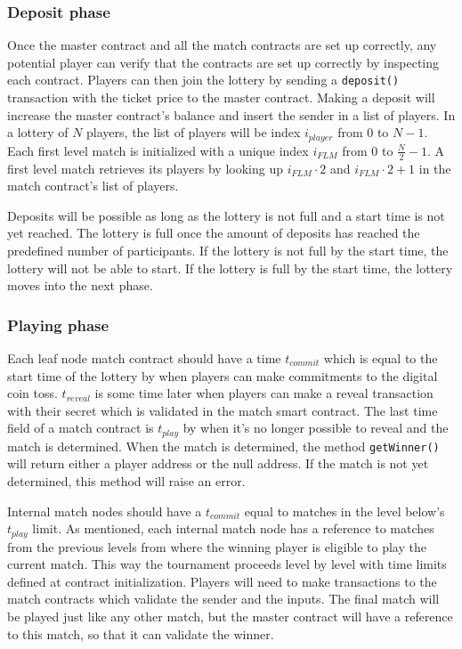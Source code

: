 \subsubsection{Deposit phase}
Once the master contract and all the match contracts are set up correctly, any potential player can verify that the contracts are set up correctly by inspecting each contract. Players can then join the lottery by sending a \texttt{deposit()} transaction with the ticket price to the master contract. Making a deposit will increase the master contract's balance and insert the sender in a list of players. In a lottery of $N$ players, the list of players will be index $i_{player}$ from $0$ to $N-1$. Each first level match is initialized with a unique index $i_{FLM}$ from $0$ to $\frac{N}{2}-1$. A first level match retrieves its players by looking up $i_{FLM} \cdot 2$ and $i_{FLM} \cdot 2 + 1$ in the match contract's list of players.

Deposits will be possible as long as the lottery is not full and a start time is not yet reached. The lottery is full once the amount of deposits has reached the predefined number of participants. If the lottery is not full by the start time, the lottery will not be able to start. If the lottery is full by the start time, the lottery moves into the next phase.

\subsubsection{Playing phase}
Each leaf node match contract should have a time $t_{commit}$ which is equal to the start time of the lottery by when players can make commitments to the digital coin toss. $t_{reveal}$ is some time later when players can make a reveal transaction with their secret which is validated in the match smart contract. The last time field of a match contract is $t_{play}$ by when it's no longer possible to reveal and the match is determined. When the match is determined, the method \texttt{getWinner()} will return either a player address or the null address. If the match is not yet determined, this method will raise an error.

Internal match nodes should have a $t_{commit}$ equal to matches in the level below's $t_{play}$ limit. As mentioned, each internal match node has a reference to matches from the previous levels from where the winning player is eligible to play the current match. This way the tournament proceeds level by level with time limits defined at contract initialization. Players will need to make transactions to the match contracts which validate the sender and the inputs. The final match will be played just like any other match, but the master contract will have a reference to this match, so that it can validate the winner.

